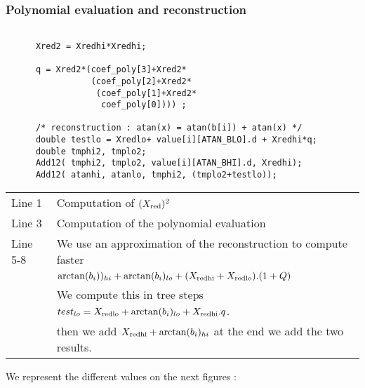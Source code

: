 \subsubsection{Polynomial evaluation and reconstruction}

\begin{lstlisting}[caption={Polynomial Evaluation and recontruction},firstnumber=1]

      Xred2 = Xredhi*Xredhi;

      q = Xred2*(coef_poly[3]+Xred2*
                 (coef_poly[2]+Xred2*
                  (coef_poly[1]+Xred2*
                   coef_poly[0]))) ;

      /* reconstruction : atan(x) = atan(b[i]) + atan(x) */
      double testlo = Xredlo+ value[i][ATAN_BLO].d + Xredhi*q;
      double tmphi2, tmplo2;
      Add12( tmphi2, tmplo2, value[i][ATAN_BHI].d, Xredhi);
      Add12( atanhi, atanlo, tmphi2, (tmplo2+testlo));

\end{lstlisting}

\begin{tabular}{ll}
Line 1 & Computation of $(X_{\mathrm{red}})^2$\\
Line 3 & Computation of the polynomial evaluation\\
Line 5-8 & We use an approximation of the reconstruction to compute faster  \\
       & $\arctan(b_i))_{hi}+\arctan(b_i)_{lo} +
        (X_{\mathrm{red hi}}+X_{\mathrm{red lo}}).(1+Q)$\\
       & We compute this in tree steps $test_{lo}= X_{\mathrm{red lo}}+ \arctan(b_i)_{lo}
        + X_{\mathrm{red hi}}.q$.\\
       & then we add $X_{\mathrm{red hi}}+\arctan(b_i)_{hi}$ at the end we add the two results.\\
\end{tabular}

We represent the different values on the next figures :

